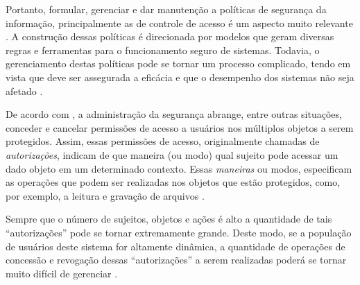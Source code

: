 \documentclass[
	12pt,				%
	openright,			%
	oneside,			%
	a4paper,			%
	english,			%
	french,				%
	spanish,			%
	brazil				%
	]{abntex2}
\begin{document}

Portanto, formular, gerenciar e dar manutenção a políticas de segurança da informação, principalmente as de controle de acesso é um aspecto muito relevante \cite{li_security_2006}. A construção dessas políticas é direcionada por modelos que geram diversas regras e ferramentas para o funcionamento seguro de sistemas. Todavia, o gerenciamento destas políticas pode se tornar um processo complicado, tendo em vista que deve ser assegurada a eficácia e que o desempenho dos sistemas não seja afetado \cite{ueda_tese_2012}.

De acordo com , a administração da segurança abrange, entre outras situações, conceder e cancelar permissões de acesso a usuários nos múltiplos objetos a serem protegidos. Assim, essas permissões de acesso, originalmente chamadas de \textit{autorizações}, indicam de que maneira (ou modo) qual sujeito pode acessar um dado objeto em um determinado contexto. Essas \textit{maneiras} ou modos, especificam as operações que podem ser realizadas nos objetos que estão protegidos, como, por exemplo, a leitura e gravação de arquivos \cite[p. 21]{bellettini_role_2001}.
	
Sempre que o número de sujeitos, objetos e ações é alto a quantidade de tais ``autorizações'' pode se tornar extremamente grande. Deste modo, se a população de usuários deste sistema for altamente dinâmica, a quantidade de operações de concessão e revogação dessas ``autorizações'' a serem realizadas poderá se tornar muito difícil de gerenciar \cite[p. 21]{bellettini_role_2001}.
\end{document}

